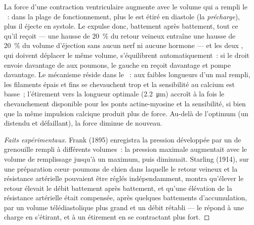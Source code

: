 \begin{theorem}\label{thm:b2:heart:starling}
La force d'une contraction ventriculaire augmente avec le volume qui a
rempli le ~: dans la plage de fonctionnement, plus le
 est étiré en diastole (la \emph{précharge}), plus il éjecte en
systole. Le  expulse donc, battement après battement, tout ce qu'il
reçoit --- une hausse de \qty{20}{\%} du retour veineux entraîne une
hausse de \qty{20}{\%} du volume d'éjection sans aucun nerf ni aucune
hormone --- et les deux , qui doivent déplacer le même volume,
s'équilibrent automatiquement~: si le  droit envoie davantage de
 aux poumons, le  gauche en reçoit davantage et pompe davantage.
Le mécanisme réside dans le ~: aux faibles longueurs d'un
 mal rempli, les filaments épais et fins se chevauchent trop
et la sensibilité au calcium est basse~; l'étirement vers la longueur
optimale (\qty{2.2}{\micro m}) accroît à la fois le chevauchement
disponible pour les ponts actine-myosine et la sensibilité, si bien que
la même impulsion calcique produit plus de force. Au-delà de l'optimum
(un  distendu et défaillant), la force diminue de nouveau.
\end{theorem}
\begin{proof}[Faits expérimentaux]
Frank (1895) enregistra la pression développée par un  de
grenouille rempli à différents volumes~: la pression maximale augmentait
avec le volume de remplissage jusqu'à un maximum, puis diminuait.
Starling (1914), sur une préparation cœur--poumons de chien dans laquelle
le retour veineux et la résistance artérielle pouvaient être réglés
indépendamment, montra qu'élever le retour élevait le débit battement
après battement, et qu'une élévation de la résistance artérielle était
compensée, après quelques battements d'accumulation, par un volume
télédiastolique plus grand et un débit rétabli --- le  répond à
une charge en s'étirant, et à un étirement en se contractant plus fort.
\end{proof}

